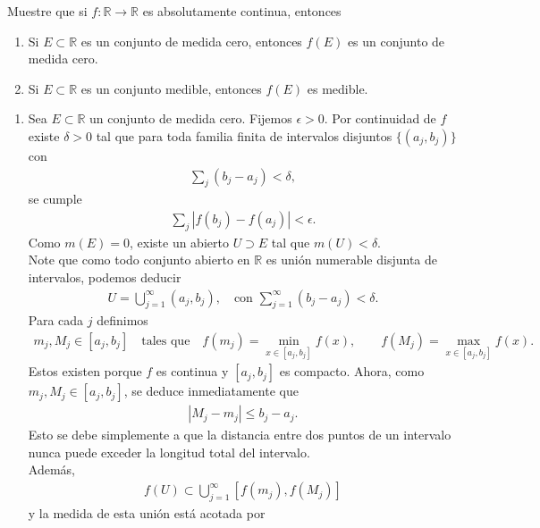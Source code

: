 \begin{homeworkProblem}
  Muestre que si $f:\mathbb{R}\to \mathbb{R}$ es absolutamente continua, entonces
  \begin{enumerate}
    \item Si $E\subset \mathbb{R}$ es un conjunto de medida cero, entonces $f(E)$ es un conjunto de medida cero.
    \item Si $E\subset \mathbb{R}$ es un conjunto medible, entonces $f(E)$ es medible. 
  \end{enumerate}
\end{homeworkProblem}
\begin{solucion}
\begin{enumerate}
  \item Sea $E\subset\mathbb{R}$ un conjunto de medida cero. Fijemos $\epsilon>0$. Por continuidad de $f$ existe $\delta>0$ tal que para toda familia finita de intervalos disjuntos $\{(a_{j},b_{j})\}$ con 
\begin{align*}
  \sum_{j}(b_{j}-a_{j})<\delta, 
\end{align*}
se cumple
\begin{align*}
  \sum_{j}|f(b_{j})-f(a_{j})|<\epsilon. 
\end{align*}
Como $m(E)=0$, existe un abierto $U\supset E$ tal que $m(U)<\delta$.\\
Note que como todo conjunto abierto en $\mathbb{R}$ es unión numerable disjunta de intervalos, podemos deducir
\begin{align*}
U=\bigcup_{j=1}^{\infty}(a_{j},b_{j}),\quad\text{con }\sum_{j=1}^{\infty}(b_{j}-a_{j})<\delta.
\end{align*}
Para cada $j$ definimos
\begin{align*}
m_{j},M_{j}\in[a_{j},b_{j}]\quad\text{tales que}\quad f(m_{j})=\min_{x\in[a_{j},b_{j}]}f(x),\qquad f(M_{j})=\max_{x\in[a_{j},b_{j}]}f(x).
\end{align*}
Estos existen porque $f$ es continua y $[a_{j},b_{j}]$ es compacto. Ahora, como $m_{j},M_{j}\in[a_{j},b_{j}]$, se deduce inmediatamente que
\begin{align*}
|M_{j}-m_{j}| \leq b_{j}-a_{j}.
\end{align*}
Esto se debe simplemente a que la distancia entre dos puntos de un intervalo nunca puede exceder la longitud total del intervalo.\\
Además,
\begin{align*}
  f(U)\subset\bigcup_{j=1}^{\infty}[f(m_{j}),f(M_{j})]  
\end{align*}
y la medida de esta unión está acotada por

\end{enumerate}
\end{solucion}

